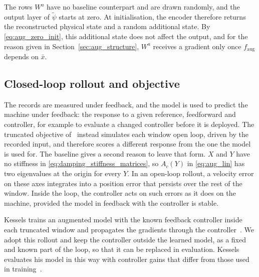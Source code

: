 The rows $W^a$ have no baseline counterpart and are drawn randomly, and the
output layer of $\tilde\psi$ starts at zero.
At initialisation, the encoder therefore returns the reconstructed physical
state and a random additional state.
By \eqref{eq:aug_zero_init}, this additional state does not affect the
output, and for the reason given in Section~\ref{sec:aug_structure}, $W^a$
receives a gradient only once $f_{\mathrm{aug}}$ depends on $\bar x$.

\subsection{Closed-loop rollout and objective}\label{sec:aug_closed_loop}
The records are measured under feedback, and the model is used to predict the
machine under feedback: the response to a given reference, feedforward and
controller, for example to evaluate a changed controller before it is
deployed.
The truncated objective of~\cite[Eq.~(22)]{hoekstra2026lfr} instead
simulates each window open loop, driven by the recorded input, and
therefore scores a different response from the one the model is used for.
The baseline gives a second reason to leave that form.
$X$ and $Y$ have no stiffness in \eqref{eq:damping_stiffness_matrices}, so
$A_c(Y)$ in \eqref{eq:aug_lin} has two eigenvalues at the origin for every
$Y$.
In an open-loop rollout, a velocity error on these axes integrates into a
position error that persists over the rest of the window.
Inside the loop, the controller acts on such errors as it does on the
machine, provided the model in feedback with the controller is stable.

Kessels trains an augmented model with the known feedback controller inside
each truncated window and propagates the gradients through the
controller~\cite[Eqs.~(5.12), (5.13c), (5.13d)]{kessels2025ai}.
We adopt this rollout and keep the controller outside the learned model, as a
fixed and known part of the loop, so that it can be replaced in evaluation.
Kessels evaluates his model in this way with controller gains that differ
from those used in training~\cite[Sec.~5.3.2.3]{kessels2025ai}.

